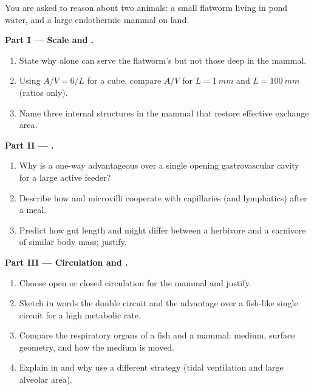 \begin{problem}
\label{pb:g12:animal-exchange:1}
You are asked to reason about two animals: a small flatworm living in
pond water, and a large endothermic mammal on land.

\medskip
\noindent\textbf{Part I --- Scale and .}
\begin{enumerate}
  \item State why  alone can serve the flatworm's  but
        not those deep in the mammal.
  \item Using $A/V = 6/L$ for a cube, compare $A/V$ for $L=\qty{1}{mm}$
        and $L=\qty{100}{mm}$ (ratios only).
  \item Name three internal structures in the mammal that restore
        effective exchange area.
\end{enumerate}

\medskip
\noindent\textbf{Part II --- .}
\begin{enumerate}[resume]
  \item Why is a one-way  advantageous over a single
        opening gastrovascular cavity for a large active feeder?
  \item Describe how  and microvilli cooperate with capillaries
        (and lymphatics) after a meal.
  \item Predict how gut length and  might differ between a
        herbivore and a carnivore of similar body mass; justify.
\end{enumerate}

\medskip
\noindent\textbf{Part III --- Circulation and .}
\begin{enumerate}[resume]
  \item Choose open or closed circulation for the mammal and justify.
  \item Sketch in words the double circuit and the advantage over a
        fish-like single circuit for a high metabolic rate.
  \item Compare the respiratory organs of a fish and a mammal: medium,
        surface geometry, and how the medium is moved.
  \item Explain  in  and why  use a
        different strategy (tidal ventilation and large alveolar area).
\end{enumerate}


\end{problem}
